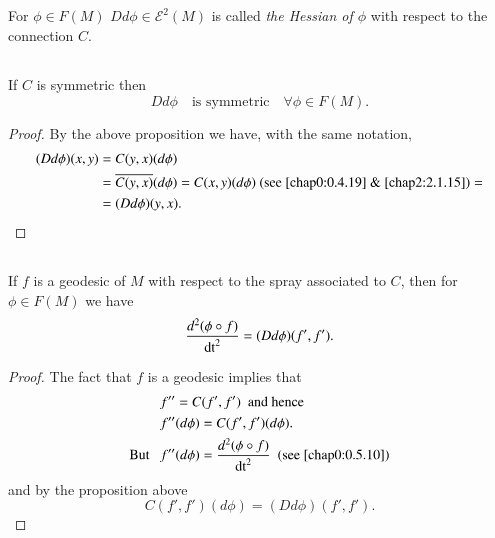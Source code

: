 \subsection{}\label{chap2:2.4.11}

\begin{defi*}
For $\phi\in F(M)$ $Dd\phi\in\mathscr{E}^{2}(M)$ is called {\em the
  Hessian of $\phi$} with respect to the connection $C$.
\end{defi*}


\subsection{}\label{chap2:2.4.12}

\begin{coro*}
If $C$ is symmetric then
$$
Dd\phi\quad\text{is symmetric}\quad \forall \phi\in F(M).
$$
\end{coro*}

\begin{proof}
By the above proposition we have, with the same notation,
\begin{align*}
(Dd\phi)(x,y) &= C(y,x)(d\phi)\\
&= \overline{C(y,x)}(d\phi)=C(x,y)(d\phi) \ \text{(see \ref{chap0:0.4.19}
    \& \ref{chap2:2.1.15})}=\\
&= (Dd\phi)(y,x).
\end{align*}
\end{proof}

\subsection{}\label{chap2:2.4.13}

\begin{prop*}
If $f$ is a geodesic of $M$ with respect to the spray associated to
$C$, then for $\phi\in F(M)$ we have
$$
\frac{d^{2}(\phi\circ f)}{\operatorname{dt}^{2}}=(Dd\phi)(f',f').
$$
\end{prop*}

\begin{proof}
The fact that $f$ is a geodesic implies that
\begin{align*}
& f'' =C(f',f')\text{ \ and hence}\\
& f''(d\phi)=C(f',f')(d\phi).\\
\text{But \ \ } & f''(d\phi)=\frac{d^{2}(\phi\circ f)}{\operatorname{dt}^{2}}
\ \ \text{(see \ref{chap0:0.5.10})}
\end{align*}
and by the proposition above
$$
C(f',f')(d\phi)=(Dd\phi)(f',f').
$$
\end{proof}

